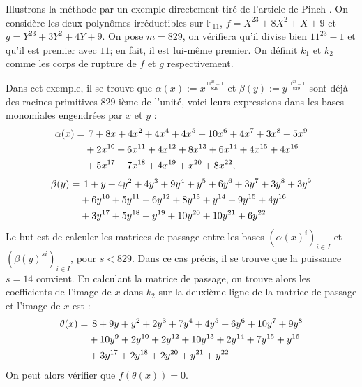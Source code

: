 \documentclass[a4paper]{article} %
\numberwithin{section}{part}
\numberwithin{equation}{section}
\newcommand\GF[1]{\mathbb{F}_{#1}}
\begin{document}
\begin{ex}
Illustrons la méthode par un exemple directement tiré de l'article de 
Pinch \cite{Pin}. On considère les deux polynômes irréductibles sur $\GF{11}$, 
$f = X^{23} + 8X^2 + X + 9$ et $g = Y^{23} + 3Y^2 + 4Y + 9$. On pose $m = 829$, 
on vérifiera qu'il divise bien $11^{23} - 1$ et qu'il est premier avec $11$; 
en fait, il est lui-même premier. On définit $k_1$ et $k_2$ comme les corps de 
rupture de $f$ et $g$ respectivement.\par
Dans cet exemple, il se trouve que $\alpha(x) := x^{\tfrac{11^{23} - 1}{829}}$ 
et $\beta(y) := y^{\tfrac{11^{23} - 1}{829}}$ sont déjà des racines primitives
$829$-ième de l'unité, voici leurs expressions dans les bases monomiales 
engendrées par $x$ et $y$ :
\begin{align*}
\alpha(x) =&\hspace{0.15cm} 7 + 8x + 4x^2 + 4x^4 + 4x^5 + 10x^6 + 4x^7 + 3x^8 + 
5x^9\\
& + 2x^{10} + 6x^{11} + 4x^{12} + 8x^{13} + 6x^{14} + 4x^{15} + 4x^{16}\\
& + 5x^{17}  + 7x^{18} + 4x^{19} + x^{20} + 8x^{22},
\end{align*}
\begin{align*}
\beta(y) =&\hspace{0.15cm}1 + y + 4y^2 + 4y^3 + 9y^4 + y^5 + 6y^6 + 3y^7 + 3y^8 
+ 3y^9\\
& + 6y^{10} + 5y^{11} + 6y^{12} + 8y^{13} + y^{14} + 9y^{15} + 4y^{16}\\
& + 3y^{17} + 5y^{18} + y^{19} + 10y^{20} + 10y^{21} + 6y^{22}
\end{align*}
Le but est de calculer les matrices de passage entre les bases
$(\alpha(x)^i)_{i\in I}$ et $(\beta(y)^{si})_{i\in I}$, pour $s < 829$.
Dans ce cas précis, il se trouve que la puissance $s = 14$ convient. En 
calculant la matrice de passage, on trouve alors les coefficients de l'image de 
$x$ dans $k_2$ sur la deuxième ligne de la matrice de passage et l'image de $x$ 
est :
\begin{align*}
\theta(x) =&\hspace{0.15cm} 8 + 9y + y^2 + 2y^3 + 7y^4 + 4y^5 + 6y^6 + 10y^7 + 
9y^8\\
& + 10y^9 + 2y^{10} + 2y^{12} + 10y^{13} + 2y^{14} + 7y^{15} + y^{16}\\
& + 3y^{17} + 2y^{18} + 2y^{20} + y^{21} + y^{22}
\end{align*}
On peut alors vérifier que $f(\theta(x)) = 0$.
\end{ex}
\end{document}
